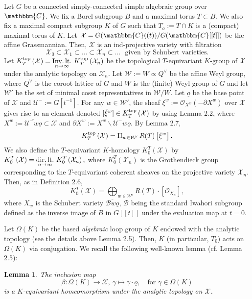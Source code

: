 \documentclass{article}
\newtheorem{lemma}[theorem]{Lemma}
\def\X{\mathcal{X}}
\def\B{\mathcal{B}}
\def\W{\mathcal{W}}
\def\mathbb{\mathbbm}
\def\U{\mathcal{U}}
\def\ref#1{#1}
\def\Inv.lt.{\rm{Inv.\, lt.}}
\def\dir.lt.{\rm{dir.\, lt.}}
\def\top{\rm{top}}
\begin{document}
Let $G$ be a connected simply-connected simple algebraic group over $\mathbb{C}$. We fix a Borel subgroup $B$ and  a maximal torus ${T}\subset {B}$. We also fix a maximal compact subgroup $K$ of $G$ such that $T_o:=T\cap K$ is a (compact) maximal torus of $K$. 
Let $\X = G(\mathbb{C}((t))/G(\mathbb{C}[[t]])$  be the  affine Grassmannian. Then, $\X$ is an ind-projective variety with filtration 
$$\X_0\subset \X_1\subset \ldots \subset\X_n \subset\ldots \,\,\text{ given by Schubert varieties.}
$$ Let $
K_T^{\top}\left(\X\right)= \underset{n\rightarrow \infty}{\Inv.lt.}\,\,K_T^{\top}\left(\X_n\right)$ be the topological $T$-equivariant  $K$-group of $\X$  under the analytic topology on $\X_n$. Let $\W:=W\propto Q^\vee$ be the affine Weyl group, where $Q^\vee$ is the coroot lattice of $G$ and  $W$ is the (finite) Weyl group of $G$ and let  $\W'$ be the set of minimal  coset representatives in $\W/W$. Let $\underline{o}$ be the base point of ${\X}$ and $\U^-:= G[t^{-1}]$. 
For any $ w\in \W'$, the sheaf $\xi^w:=\mathcal{O}_{ X^w} \left( -\partial  X^w \right)$ over ${\X}$ gives rise to an element denoted $[\bar\xi^w]\in 
K_T^{\top}\left(\X\right)$ by using Lemma \ref{2.2}, where $X^w := \overline{\U^- w \underline{o}}\subset \X$ and
$\partial  X^w :=  X^w \backslash \U^- w \underline{o}$.  By Lemma \ref{2.7}, 
$$
K_T^{\top} \left(\X\right) = \Pi_{w\in \W'} \,R(T) \left[\bar{\xi}^{w}\right].
$$
We also define the  $T$-equivariant $K$-homology $K^T_0 \left( {\X}\right)$ by 
$
K^T_0 \left( {\X}\right) = \underset{n\rightarrow \infty}{\dir.lt.}\,\, K^T_0 \left( {\X}_n\right), 
$ where $K^T_0 \left( {\X}_n\right)$ is the Grothendieck group corresponding to the $T$-equivariant coherent sheaves on the projective variety $\X_n$. Then, as in Definition \ref{2.6},
$$
K_0^T\left(\X\right) = \bigoplus_{ w\in \W'} R(T)\cdot \left[\mathcal{O}_{X_w}\right],
$$
where $X_w$ is the Schubert variety $\overline{\B w \underline{o}}$, $\B$ being the standard Iwahori subgroup defined as  the inverse image of $B$ in $G[[t]]$ under the evaluation map at $t=0$.

Let $\Omega (K)$ be the based {\it algebraic}  loop group of $K$ endowed with the analytic topology (see the details above Lemma \ref{2.5}). 
Then, $K$ (in particular, $T_0$) acts on $\Omega (K)$ via conjugation. We recall the following well-known lemma (cf. Lemma \ref{2.5}):
\begin{lemma} 
The inclusion map 
$$ 
\beta: \Omega (K) \rightarrow \X,~ \gamma \mapsto {\gamma}\cdot \underline{o},\quad \mbox{for } \gamma\in \Omega (K)
$$
is a $K$-equivariant homeomorphism  under the analytic topology on $\X$.  
\end{lemma}
\end{document}
